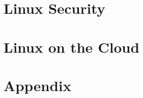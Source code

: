 










\part{Linux Security}








\part{Linux on the Cloud}







\part{Appendix}






\printindex


